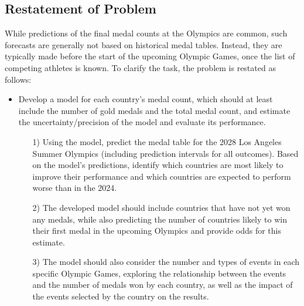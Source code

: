 \documentclass[12pt]{article}  %
\begin{document}
\subsection{Restatement of Problem}
While predictions of the final medal counts at the Olympics are common, such forecasts are generally not based on historical medal tables. Instead, they are typically made before the start of the upcoming Olympic Games, once the list of competing athletes is known. To clarify the task, the problem is restated as follows:

\begin{itemize}
	\setlength{\parsep}{0ex} %
	\setlength{\topsep}{2ex} %
	\setlength{\itemsep}{1ex} %
	\item Develop a model for each country’s medal count, which should at least include the number of gold medals and the total medal count, and estimate the uncertainty/precision of the model and evaluate its performance.
		\begin{itemize}
		\item[1)]
Using the model, predict the medal table for the 2028 Los Angeles Summer Olympics (including prediction intervals for all outcomes). Based on the model’s predictions, identify which countries are most likely to improve their performance and which countries are expected to perform worse than in the 2024.
	\end{itemize}
	\begin{itemize}
		\item[2)]
		The developed model should include countries that have not yet won any medals, while also predicting the number of countries likely to win their first medal in the upcoming Olympics and provide odds for this estimate.
	\end{itemize}
		\begin{itemize}
		\item[3)]
The model should also consider the number and types of events in each specific Olympic Games, exploring the relationship between the events and the number of medals won by each country, as well as the impact of the events selected by the country on the results.
	\end{itemize}
	

\end{itemize}
\end{document}
